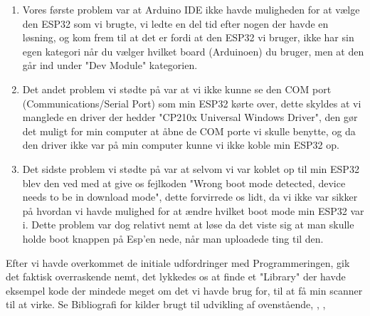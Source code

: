     \begin{enumerate}    
        \item Vores første problem var at Arduino IDE ikke havde muligheden for at vælge den ESP32 som vi brugte, vi ledte en del tid efter nogen der havde en løsning, og kom frem til at det er fordi at den ESP32 vi bruger,
            ikke har sin egen kategori når du vælger hvilket board (Arduinoen) du bruger, men at den går ind under "Dev Module" kategorien.

        \item Det andet problem vi stødte på var at vi ikke kunne se den COM port (Communications/Serial Port) som min ESP32 kørte over, dette skyldes at vi manglede en driver der hedder "CP210x Universal Windows Driver",
            den gør det muligt for min computer at åbne de COM porte vi skulle benytte, og da den driver ikke var på min computer kunne vi ikke koble min ESP32 op.
        
        \item Det sidste problem vi stødte på var at selvom vi var koblet op til min ESP32 blev den ved med at give os fejlkoden "Wrong boot mode detected, device needs to be in download mode", dette forvirrede os lidt,
            da vi ikke var sikker på hvordan vi havde mulighed for at ændre hvilket boot mode min ESP32 var i. Dette problem var dog relativt nemt at løse da det viste sig at man skulle holde boot knappen på Esp'en nede,
            når man uploadede ting til den.
    \end{enumerate} 
        
        Efter vi havde overkommet de initiale udfordringer med Programmeringen, gik det faktisk overraskende nemt, det lykkedes os at finde et "Library" der havde eksempel kode der mindede meget om det vi havde brug for,
        til at få min scanner til at virke. \newline
        Se Bibliografi for kilder brugt til udvikling af ovenstående, \cite{ardDrive}, \cite{ardrfid}, \cite{ardProg}
